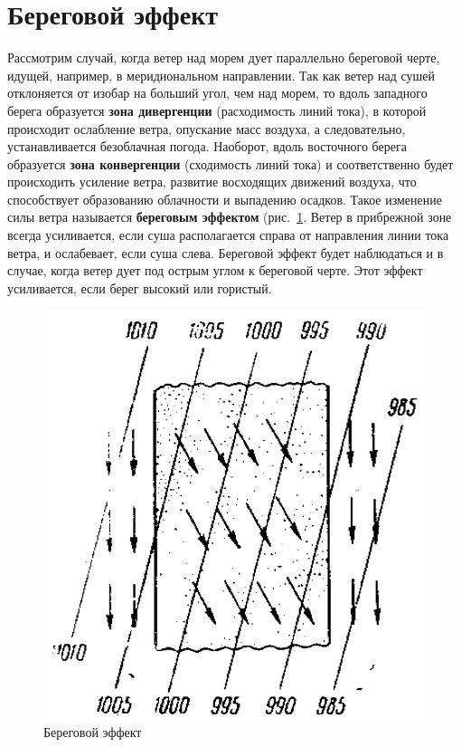 \documentclass[a4paper, 12pt, twoside, draft, book, russian, fittopage, cyremdash, openright]{ncc}
\begin{document}
\section{Береговой эффект}
\label{sec:coast_effect}

Рассмотрим случай, когда ветер над морем дует параллельно береговой
черте, идущей, например, в меридиональном направлении. Так как ветер
над сушей отклоняется от изобар на больший угол, чем над морем, то
вдоль западного берега образуется \textbf{зона
  дивергенции} (расходимость линий тока), в
которой происходит ослабление ветра, опускание масс воздуха, а
следовательно, устанавливается безоблачная погода. Наоборот, вдоль
восточного берега образуется \textbf{зона
  конвергенции} (сходимость линий тока) и
соответственно будет происходить усиление ветра, развитие восходящих
движений воздуха, что способствует образованию облачности и выпадению
осадков. Такое изменение силы ветра называется \textbf{береговым
  эффектом}
(рис.~\ref{fig:02_coast_effect}. Ветер в прибрежной зоне всегда
усиливается, если суша располагается справа от направления линии тока
ветра, и ослабевает, если суша слева. Береговой эффект будет
наблюдаться и в случае, когда ветер дует под острым углом к береговой
черте. Этот эффект усиливается, если берег высокий или гористый.

\begin{figure}[htb]
   \centering
   \includegraphics[scale=0.2]{02_coast_effect.png}
   \caption{Береговой эффект}
   \label{fig:02_coast_effect}
\end{figure}
\end{document}

